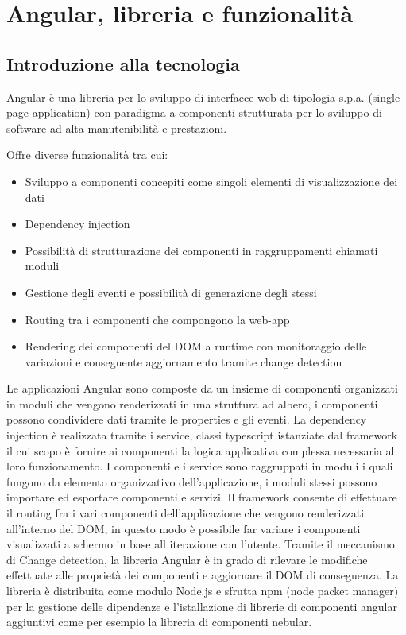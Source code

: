 \chapter{Angular, libreria e funzionalità}
\section{Introduzione alla tecnologia}
Angular è una libreria per lo sviluppo di interfacce web di tipologia s.p.a. (single page application) con paradigma a componenti strutturata per lo sviluppo di software ad alta manutenibilità e prestazioni.

Offre diverse funzionalità tra cui:
\begin{itemize}
    \item Sviluppo a componenti concepiti come singoli elementi di visualizzazione dei dati
    \item Dependency injection
    \item Possibilità di strutturazione dei componenti in raggruppamenti chiamati moduli
    \item Gestione degli eventi e possibilità di generazione degli stessi
    \item Routing tra i componenti che compongono la web-app
    \item Rendering dei componenti del DOM a runtime con monitoraggio delle variazioni e conseguente aggiornamento tramite change detection
\end{itemize}
Le applicazioni Angular sono composte da un insieme di componenti organizzati in moduli che vengono renderizzati in una struttura ad albero, i componenti possono condividere dati tramite le properties e gli eventi.
\newline
\newline
La dependency injection è realizzata tramite i service, classi typescript istanziate dal framework il cui scopo è fornire ai componenti la logica applicativa complessa necessaria al loro funzionamento.
\newline
\newline
I componenti e i service sono raggruppati in moduli i quali fungono da elemento organizzativo dell'applicazione, i moduli stessi possono importare ed esportare componenti e servizi.
\newline
\newline
Il framework consente di effettuare il routing fra i vari componenti dell'applicazione che vengono renderizzati all'interno del DOM, in questo modo è possibile far variare i componenti visualizzati a schermo in base all iterazione con l'utente.
\newline
\newline
Tramite il meccanismo di Change detection, la libreria Angular è in grado di rilevare le modifiche effettuate alle proprietà dei componenti e aggiornare il DOM di conseguenza.
\newline
\newline
La libreria è distribuita come modulo Node.js e sfrutta npm (node packet manager) per la gestione delle dipendenze e l'istallazione di librerie di componenti angular aggiuntivi come per esempio la libreria di componenti nebular.
\newline
\newpage%
